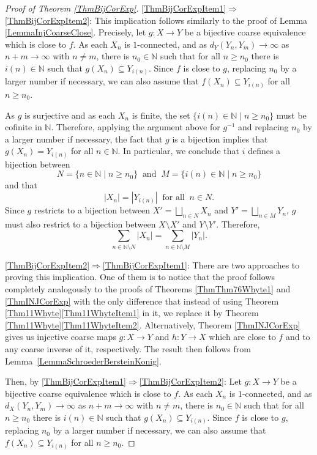 \documentclass[11pt]{amsart}
\newcommand{\N}{\mathbb{N}}
\numberwithin{equation}{section}
\theoremstyle{definition}
\theoremstyle{remark}
\numberwithin{equation}{section}
\begin{document}
\begin{proof}[Proof of Theorem \ref{ThmBijCorExp}]
 \eqref{ThmBijCorExpItem1}$\Rightarrow$\eqref{ThmBijCorExpItem2}: This implication follows similarly to the proof of Lemma \ref{LemmaInjCoarseClose}. Precisely, let $g\colon X\to Y$ be a bijective coarse equivalence which is close to $f$. As each $X_n$ is $1$-connected, and as $d_Y(Y_n,Y_m)\to \infty$ as $n+m\to \infty $ with $n\neq m$, there is $n_0\in \N$ such that for all $n\geq n_0$ there is $i(n)\in \N$ such that $g(X_n)\subseteq Y_{i(n)}$. Since $f$ is close to $g$, replacing $n_0$ by a larger number if necessary, we can also assume that $f(X_n)\subseteq Y_{i(n)}$ for all $n\geq n_0$.

As $g$ is surjective and as each $X_n$ is finite, the set $\{i(n)\in\N\mid n\geq n_0\}$ must be cofinite in $\N$. Therefore, applying the argument above for $g^{-1}$ and replacing $n_0$ by a larger number if necessary, the fact that $g$ is a bijection implies that $g(X_n)=Y_{i(n)}$ for all $n\in\N$. In particular, we conclude that $i$ defines a bijection between
\[
N=\{n\in\N\mid n\geq n_0\}\ \text{ and }\ M=\{i(n)\in\N\mid n\geq n_0\}
\]
and that 
\[
|X_n|=|Y_{i(n)}| \ \text{ for all }\ n\in N.
\]
Since $g$ restricts to a bijection between $X'=\bigsqcup_{n\in N}X_n$ and $Y'=\bigsqcup_{n\in M}Y_n$, $g$ must also restrict to a bijection between $X\setminus X'$ and $Y\setminus Y'$. Therefore,
\[
\sum_{n\in \N\setminus N}|X_n|=\sum_{n\in \N\setminus M}|Y_n|.
\]

\eqref{ThmBijCorExpItem2}$\Rightarrow$\eqref{ThmBijCorExpItem1}: There are two approaches to proving this implication. One of them is to notice that the proof follows completely analogously to the proofs of Theorems \ref{ThmThm76Whyte1} and \ref{ThmINJCorExp} with the only difference that instead of using Theorem \ref{Thm11Whyte}\eqref{Thm11WhyteItem1} in it, we replace it by Theorem \ref{Thm11Whyte}\eqref{Thm11WhyteItem2}. Alternatively, Theorem \ref{ThmINJCorExp} gives us injective coarse maps $g\colon X\to Y$ and $h\colon Y\to X$ which are close to $f$ and to any coarse inverse of it, respectively. The result then follows from Lemma~\ref{LemmaSchroederBersteinKonig}.
 \iffalse

Then, by \eqref{ThmBijCorExpItem1}$\Rightarrow$\eqref{ThmBijCorExpItem2}: Let $g\colon X\to Y$ be a bijective coarse equivalence which is close to $f$. As each $X_n$ is $1$-connected, and as $d_X(Y_n,Y_m)\to \infty$ as $n+m\to \infty $ with $n\neq m$, there is $n_0\in \N$ such that for all $n\geq n_0$ there is $i(n)\in \N$ such that $g(X_n)\subseteq Y_{i(n)}$. Since $f$ is close to $g$, replacing $n_0$ by a larger number if necessary, we can also assume that $f(X_n)\subseteq Y_{i(n)}$ for all $n\geq n_0$.


\end{proof}
\end{document}
